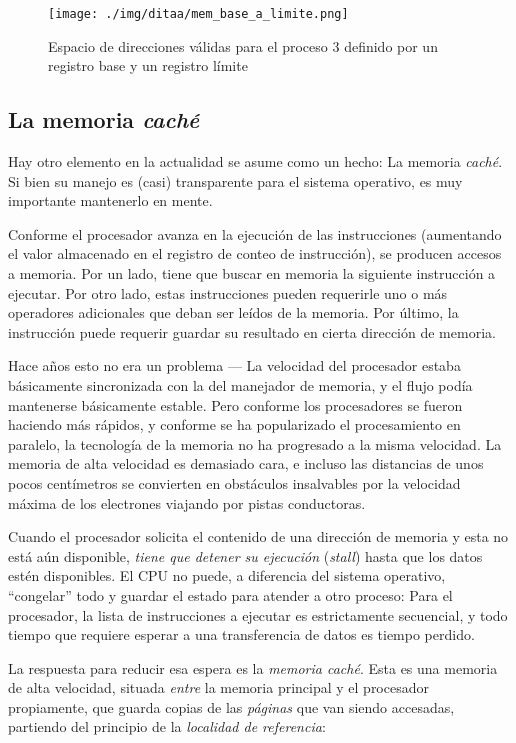 \documentclass[11pt,fleqn]{book} %
\begin{document}
\begin{figure}[htb]
\centering
\texttt{[image: ./img/ditaa/mem\_base\_a\_limite.png]}
\caption{\label{MEM_mem_base_a_limite}Espacio de direcciones válidas para el proceso 3 definido por un registro base y un registro límite}
\end{figure}
\subsection{La memoria \emph{caché}}
\label{sec-5-1-3}


Hay otro elemento en la actualidad se asume como un hecho: La memoria
\emph{caché}. Si bien su manejo es (casi) transparente para el sistema
operativo, es muy importante mantenerlo en mente.

Conforme el procesador avanza en la ejecución de las instrucciones
 (aumentando el valor almacenado en el registro de conteo de instrucción), se 
producen accesos a memoria. Por un lado, tiene que buscar en
memoria la siguiente instrucción a ejecutar. Por otro lado, estas
instrucciones pueden requerirle uno o más operadores adicionales que
deban ser leídos de la memoria. Por último, la instrucción puede
requerir guardar su resultado en cierta dirección de memoria.

Hace años esto no era un problema — La velocidad del procesador
estaba básicamente sincronizada con la del manejador de memoria, y el
flujo podía mantenerse básicamente estable. Pero conforme los
procesadores se fueron haciendo más rápidos, y conforme se ha
popularizado el procesamiento en paralelo, la tecnología de la memoria 
no ha progresado a la misma velocidad. La memoria de alta velocidad es
demasiado cara, e incluso las distancias de unos pocos centímetros se
convierten en obstáculos insalvables por la velocidad máxima de los
electrones viajando por pistas conductoras.

Cuando el procesador solicita el contenido de una dirección de memoria
y esta no está aún disponible, \emph{tiene que detener su ejecución}
(\emph{stall}) hasta que los datos estén disponibles. El CPU no puede, a
diferencia del sistema operativo, ``congelar'' todo y guardar el estado
para atender a otro proceso: Para el procesador, la lista de
instrucciones a ejecutar es estrictamente secuencial, y todo tiempo
que requiere esperar a una transferencia de datos es tiempo perdido.

La respuesta para reducir esa espera es la \emph{memoria caché}. Esta es
una memoria de alta velocidad, situada \emph{entre} la memoria principal y el
procesador propiamente, que guarda copias de las \emph{páginas} que van
siendo accesadas, partiendo del principio de la \emph{localidad de referencia}:
\end{document}
